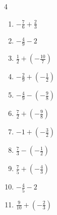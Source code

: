 \begin{multicols}{4}
\begin{enumerate}

  \item $\displaystyle -\frac{7}{6} + \frac{2}{3}$


  \item $\displaystyle -\frac{4}{9} - 2$


  \item $\displaystyle \frac{1}{2} + \left(-\frac{10}{7}\right)$


  \item $\displaystyle -\frac{2}{9} + \left(-\frac{1}{2}\right)$


  \item $\displaystyle -\frac{4}{9} - \left(-\frac{9}{8}\right)$


  \item $\displaystyle \frac{7}{2} + \left(-\frac{9}{8}\right)$


  \item $\displaystyle -1 + \left(-\frac{3}{2}\right)$


\columnbreak %

\resetques

  \item $\displaystyle \frac{7}{3} - \left(-\frac{1}{2}\right)$


  \item $\displaystyle \frac{7}{5} + \left(-\frac{4}{3}\right)$


  \item $\displaystyle -\frac{4}{5} - 2$


  \item $\displaystyle \frac{9}{10} + \left(-\frac{2}{3}\right)$


\end{enumerate}
\end{multicols}
